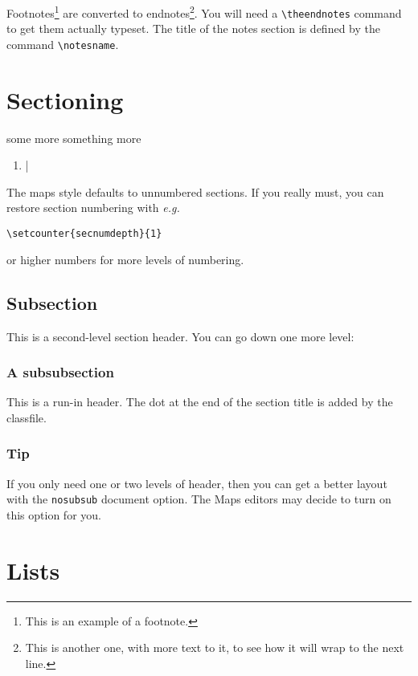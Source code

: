 \documentclass[nosubsub]{maps}
\renewcommand{\notesname}{Footnotes}
\begin{document}
\newpage
Footnotes\footnote{This is an example of a footnote.}  are converted
to endnotes\footnote{This is another one, with more text to it, to
see how it will wrap to the next line.}. You will need a
\verb+\theendnotes+ command to get them actually typeset. The title
of the notes section is defined by the command \verb+\notesname+.

\section{Sectioning}

some more
something more
\begin{enumerate}
    \item |
\end{enumerate}

The maps style defaults to unnumbered sections. If you really must,
you can restore section numbering with \emph{e.g.}
\begin{verbatim}
\setcounter{secnumdepth}{1}
\end{verbatim}
or higher numbers for more levels of numbering.

\subsection{Subsection}
This is a second-level section header. You can go down one more
level:

\subsubsection{A subsubsection}

This is a run-in header. The dot at the end of the section title is
added by the classfile.

\subsubsection{Tip}
If you only need one or two levels of header, then you can get a
better layout with the \texttt{nosubsub} document option.
The Maps editors may decide to turn on this option for you.

\section{Lists}
\end{document}
